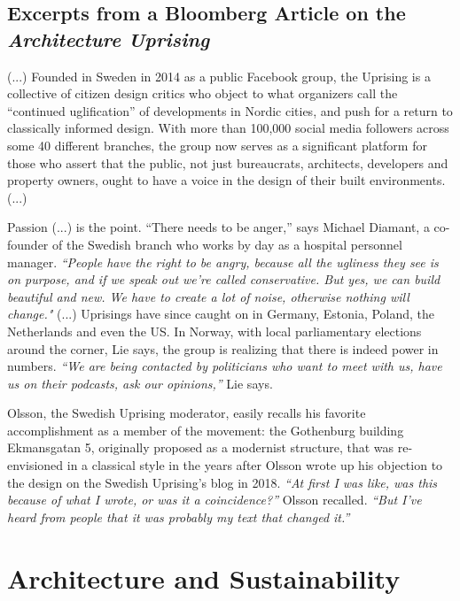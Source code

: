 \documentclass[a4paper]{article}
\begin{document}
\subsection{Excerpts from a Bloomberg Article \cite{gersten_nordic_2023} on the \textit{Architecture Uprising}}

(...) Founded in Sweden in 2014 as a public Facebook group, the Uprising is a collective of citizen design critics who object to what organizers call the “continued uglification” of developments in Nordic cities, and push for a return to classically informed design. With more than 100,000 social media followers across some 40 different branches, the group now serves as a significant platform for those who assert that the public, not just bureaucrats, architects, developers and property owners, ought to have a voice in the design of their built environments. (...)

Passion (...) is the point. “There needs to be anger,” says Michael Diamant, a co-founder of the Swedish branch who works by day as a hospital personnel manager. \textit{“People have the right to be angry, because all the ugliness they see is on purpose, and if we speak out we’re called conservative. But yes, we can build beautiful and new. We have to create a lot of noise, otherwise nothing will change." }(...) Uprisings have since caught on in Germany, Estonia, Poland, the Netherlands and even the US. In Norway, with local parliamentary elections around the corner, Lie says, the group is realizing that there is indeed power in numbers. \textit{“We are being contacted by politicians who want to meet with us, have us on their podcasts, ask our opinions,”} Lie says.

Olsson, the Swedish Uprising moderator, easily recalls his favorite accomplishment as a member of the movement: the Gothenburg building Ekmansgatan 5, originally proposed as a modernist structure, that was re-envisioned in a classical style in the years after Olsson wrote up his objection to the design on the Swedish Uprising’s blog in 2018. \textit{“At first I was like, was this because of what I wrote, or was it a coincidence?”} Olsson recalled. \textit{“But I’ve heard from people that it was probably my text that changed it.”}

\clearpage

\section{Architecture and Sustainability}
\end{document}
